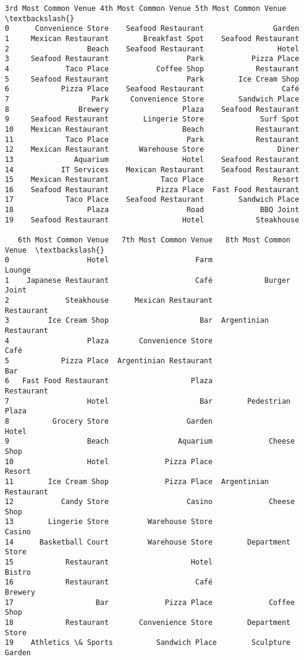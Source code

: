 \documentclass[11pt]{article}
\begin{document}
\begin{tcolorbox}[breakable, size=fbox, boxrule=.5pt, pad at break*=1mm, opacityfill=0]
\begin{Verbatim}[commandchars=\\\{\}]
   3rd Most Common Venue 4th Most Common Venue 5th Most Common Venue  \textbackslash{}
0      Convenience Store    Seafood Restaurant                Garden
1     Mexican Restaurant        Breakfast Spot    Seafood Restaurant
2                  Beach    Seafood Restaurant                 Hotel
3     Seafood Restaurant                  Park           Pizza Place
4             Taco Place           Coffee Shop            Restaurant
5     Seafood Restaurant                  Park        Ice Cream Shop
6            Pizza Place    Seafood Restaurant                  Café
7                   Park     Convenience Store        Sandwich Place
8                Brewery                 Plaza    Seafood Restaurant
9     Seafood Restaurant        Lingerie Store             Surf Spot
10    Mexican Restaurant                 Beach            Restaurant
11            Taco Place                  Park            Restaurant
12    Mexican Restaurant       Warehouse Store                 Diner
13              Aquarium                 Hotel    Seafood Restaurant
14           IT Services    Mexican Restaurant    Seafood Restaurant
15    Mexican Restaurant            Taco Place                Resort
16    Seafood Restaurant           Pizza Place  Fast Food Restaurant
17            Taco Place    Seafood Restaurant        Sandwich Place
18                 Plaza                  Road             BBQ Joint
19    Seafood Restaurant                 Hotel            Steakhouse

   6th Most Common Venue   7th Most Common Venue   8th Most Common Venue  \textbackslash{}
0                  Hotel                    Farm                  Lounge
1    Japanese Restaurant                    Café            Burger Joint
2             Steakhouse      Mexican Restaurant              Restaurant
3         Ice Cream Shop                     Bar  Argentinian Restaurant
4                  Plaza       Convenience Store                    Café
5            Pizza Place  Argentinian Restaurant                     Bar
6   Fast Food Restaurant                   Plaza              Restaurant
7                  Hotel                     Bar        Pedestrian Plaza
8          Grocery Store                  Garden                   Hotel
9                  Beach                Aquarium             Cheese Shop
10                 Hotel             Pizza Place                  Resort
11        Ice Cream Shop             Pizza Place  Argentinian Restaurant
12           Candy Store                  Casino             Cheese Shop
13        Lingerie Store         Warehouse Store                  Casino
14      Basketball Court         Warehouse Store        Department Store
15            Restaurant                   Hotel                  Bistro
16            Restaurant                    Café                 Brewery
17                   Bar             Pizza Place             Coffee Shop
18            Restaurant       Convenience Store        Department Store
19    Athletics \& Sports          Sandwich Place        Sculpture Garden


\end{Verbatim}
\end{tcolorbox}
\end{document}

